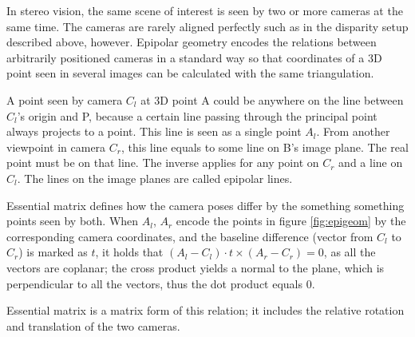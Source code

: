 In stereo vision, the same scene of interest is seen by two or more cameras at the same time.
The cameras are rarely aligned perfectly such as in the disparity setup described above, however.
Epipolar geometry encodes the relations between arbitrarily positioned cameras in a standard way so that coordinates of a 3D point seen in several images can be calculated with the same triangulation.

A point seen by camera $C_l$ at 3D point A could be anywhere on the line between $C_l$'s origin and P, because a certain line passing through the principal point always projects to a point.
This line is seen as a single point $A_l$.
From another viewpoint in camera $C_r$, this line equals to some line on B's image plane.
The real point must be on that line.
The inverse applies for any point on $C_r$ and a line on $C_l$.
The lines on the image planes are called epipolar lines.

Essential matrix defines how the camera poses differ by the something something points seen by both.
When $A_l$, $A_r$ encode the points in figure \ref{fig:epigeom} by the corresponding camera coordinates, and the baseline difference (vector from $C_l$ to $C_r$) is marked as $t$, it holds that $(A_l-C_l) \cdot t \times (A_r-C_r) = 0$, as all the vectors are coplanar; the cross product yields a normal to the plane, which is perpendicular to all the vectors, thus the dot product equals 0.
\cite{hartley03multiview}

Essential matrix is a matrix form of this relation; it includes the relative rotation and translation of the two cameras.


%
%

